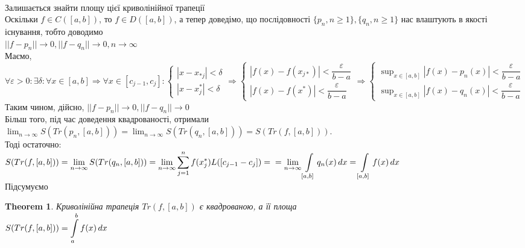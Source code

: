 \documentclass[a4paper, 14pt]{extarticle}
\def\huge{\displaystyle}
\def\bigline{\vspace{5mm}\\}
\theoremstyle{theoremdd}
\newtheorem{theorem}{Theorem}[subsection]
\theoremstyle{theoremdd}
\theoremstyle{theoremdd}
\theoremstyle{theoremdd}
\theoremstyle{theoremdd}
\theoremstyle{theoremdd}
\theoremstyle{theoremdd}
\theoremstyle{theoremdd}
\begin{document}
\bigline
Залишається знайти площу цієї криволінійної трапеції\\
Оскільки $f \in C([a,b])$, то $f \in D([a,b])$, а тепер доведімо, що послідовності $\{p_n, n \geq 1\}, \{q_n, n \geq 1\}$ нас влаштують в якості існування, тобто доводимо\\
$||f-p_n|| \to 0, ||f-q_n|| \to 0, n \to \infty$\\
Маємо, $\forall \varepsilon > 0: \exists \delta: \forall x \in [a,b] \Rightarrow \forall x \in [c_{j-1},c_j]: \begin{cases} |x-x_{*j}| < \delta \\ |x-x_j^*| < \delta \end{cases} \Rightarrow \begin{cases} |f(x) - f(x_{j*})| < \dfrac{\varepsilon}{b-a} \\ |f(x) - f(x^*)| < \dfrac{\varepsilon}{b-a} \end{cases} \Rightarrow \begin{cases} \huge \sup_{x \in [a,b]} |f(x) - p_n(x)| < \dfrac{\varepsilon}{b-a} \\ \huge \sup_{x \in [a,b]} |f(x) - q_n(x)| < \dfrac{\varepsilon}{b-a} \end{cases}$\\
Таким чином, дійсно, $||f-p_n|| \to 0, ||f - q_n|| \to 0$\\
Більш того, під час доведення квадрованості, отримали \\ $\huge \lim_{n \to \infty} S(Tr(p_n,[a,b])) = \lim_{n \to \infty} S(Tr(q_n,[a,b])) = S(Tr(f,[a,b]))$. \\ Тоді остаточно:\\
$S(Tr(f,[a,b])) = \huge \lim_{n \to \infty} S(Tr(q_n,[a,b])) = \lim_{n \to \infty} \sum_{j=1}^n f(x_j^*) L([c_{j-1}-c_j]) = \\ = \lim_{n \to \infty} \int\displaylimits_{[a,b]} q_n(x)\,dx = \int\displaylimits_{[a,b]} f(x)\,dx$
\bigline
Підсумуємо
\bigline
\begin{theorem}
Криволінійна трапеція $Tr(f,[a,b])$ є квадрованою, а її площа\\
$S(Tr(f,[a,b])) = \huge \int\displaylimits_a^b f(x)\,dx$
\bigline
\end{theorem}
\end{document}

